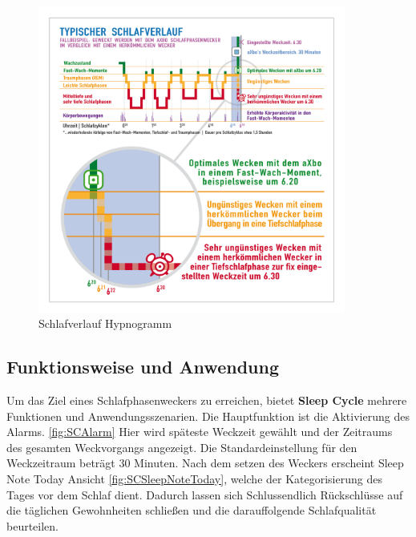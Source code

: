 \begin{figure} [h]
\centering
\includegraphics[width=0.9\textwidth]{images/aXbo_Schlafverlauf_Hypnogramm_DE.png}
\caption{Schlafverlauf Hypnogramm \cite{fig:Hypnogramm}}
\label{fig:Hypnogramm}
\end{figure}


\subsection{Funktionsweise und Anwendung}
\label{ch:Apps:sec:Sleepcycle:subsec:FuA}

Um das Ziel eines Schlafphasenweckers zu erreichen, bietet \textbf{Sleep Cycle} mehrere Funktionen und Anwendungsszenarien.
Die Hauptfunktion ist die Aktivierung des Alarms. \ref{fig:SCAlarm}
Hier wird späteste Weckzeit gewählt und der Zeitraums des gesamten Weckvorgangs angezeigt.
Die Standardeinstellung für den Weckzeitraum beträgt 30 Minuten.
Nach dem setzen des Weckers erscheint Sleep Note Today Ansicht \ref{fig:SCSleepNoteToday}, welche der Kategorisierung des Tages vor dem Schlaf dient. Dadurch lassen sich Schlussendlich Rückschlüsse auf die täglichen Gewohnheiten schließen und die darauffolgende Schlafqualität beurteilen.

